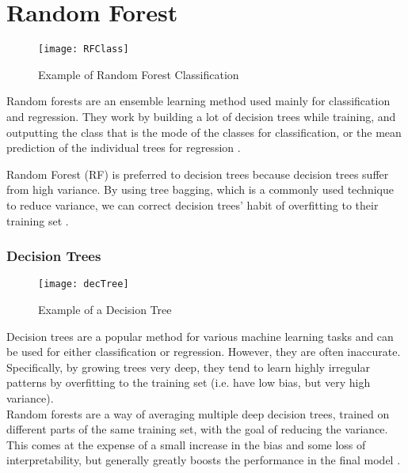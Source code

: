 \pagebreak

\section{Random Forest}

\begin{figure}[H]
	\centering
	\texttt{[image: RFClass]}
	\caption{Example of Random Forest Classification \cite{medium:RF}}
	\label{fig:RFClass}
\end{figure}

Random forests are an ensemble learning method used mainly for classification and regression. They work by building a lot of decision trees while training, and outputting the class that is the mode of the classes for classification, or the mean prediction of the individual trees for regression \cite{wiki:randomforest}.

Random Forest (RF) is preferred to decision trees because decision trees suffer from high variance. By using tree bagging, which is a commonly used technique to reduce variance, we can correct decision trees' habit of overfitting to their training set \cite{ESL}.

\subsubsection{Decision Trees}

\begin{figure}[H]
	\centering
	\texttt{[image: decTree]}
	\caption{Example of a Decision Tree \cite{KDNrf}}
	\label{fig:decTree}
\end{figure}

Decision trees are a popular method for various machine learning tasks and can be used for either classification or regression. However, they are often inaccurate. Specifically, by growing trees very deep, they tend to learn highly irregular patterns by overfitting to the training set (i.e. have low bias, but very high variance). \\
Random forests are a way of averaging multiple deep decision trees, trained on different parts of the same training set, with the goal of reducing the variance. \\
This comes at the expense of a small increase in the bias and some loss of interpretability, but generally greatly boosts the performance in the final model \cite{ESL}. 

